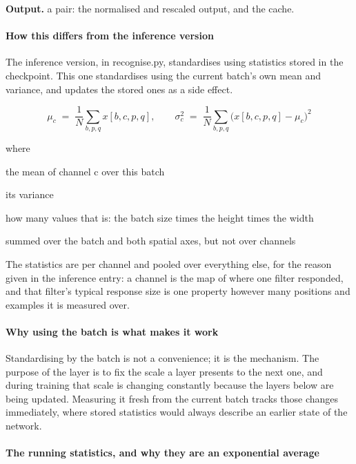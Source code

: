 \noindent\textbf{Output.} a pair: the normalised and rescaled output, and the cache.


\paragraph{How this differs from the inference version}
The inference version, in recognise.py, standardises using statistics stored in the checkpoint. This one standardises using the current batch's own mean and variance, and updates the stored ones as a side effect.


\begin{equation}
\mu_c \;=\; \frac{1}{N} \sum_{b,p,q} x[b,c,p,q], \qquad \sigma^2_c \;=\; \frac{1}{N} \sum_{b,p,q} \big(x[b,c,p,q] - \mu_c\big)^2
\end{equation}

\noindent where
\begin{description}[leftmargin=2.4em,style=nextline,font=\normalfont\ttfamily]\setlength\itemsep{1pt}
  \item[{$\mu_c$}] \normalfont the mean of channel c over this batch
  \item[{$\sigma^2_c$}] \normalfont its variance
  \item[{$N$}] \normalfont how many values that is: the batch size times the height times the width
  \item[{$\sum_{b,p,q}$}] \normalfont summed over the batch and both spatial axes, but not over channels
\end{description}
The statistics are per channel and pooled over everything else, for the reason given in the inference entry: a channel is the map of where one filter responded, and that filter's typical response size is one property however many positions and examples it is measured over.


\paragraph{Why using the batch is what makes it work}
Standardising by the batch is not a convenience; it is the mechanism. The purpose of the layer is to fix the scale a layer presents to the next one, and during training that scale is changing constantly because the layers below are being updated. Measuring it fresh from the current batch tracks those changes immediately, where stored statistics would always describe an earlier state of the network.


\paragraph{The running statistics, and why they are an exponential average}


